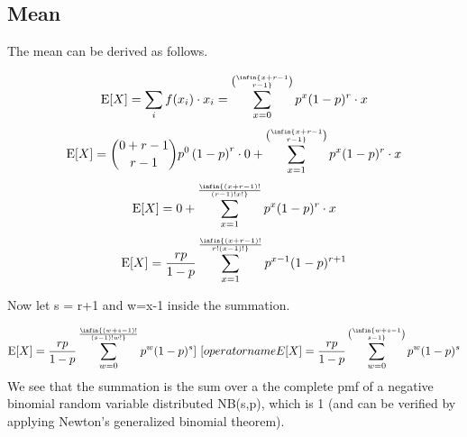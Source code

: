 \subsection{Mean}
The mean can be derived as follows.

\[\operatorname{E}[X] = \sum_i f(x_i)  \cdot x_i = \sum_{x=0}^\infin  {x+r-1 \choose r-1} p^x (1-p)^r  \cdot  x\]
\[\operatorname{E}[X] = {0+r-1 \choose r-1} p^0 \left(1-p\right)^r  \cdot  0 +  \sum_{x=1}^\infin  {x+r-1 \choose r-1} p^x (1-p)^r  \cdot  x\]
\[\operatorname{E}[X] = 0 +  \sum_{x=1}^\infin  {(x+r-1)! \over (r-1)!x!} p^x (1-p)^r  \cdot  x\]
\[\operatorname{E}[X] = {rp \over 1-p}\sum_{x=1}^\infin  {(x+r-1)! \over r!(x-1)!} p^{x-1} (1-p)^{r+1}\]

Now let s = r+1 and w=x-1 inside the summation.

\[\operatorname{E}[X] = {rp \over 1-p}\sum_{w=0}^\infin  {(w+s-1)! \over (s-1)!w!} p^w (1-p)^s]\
[\\operatorname{E}[X] = {rp \over 1-p}\sum_{w=0}^\infin  {w+s-1 \choose s-1} p^w (1-p)^s\]
We see that the summation is the sum over a the complete pmf of a negative binomial random variable distributed NB(s,p), which is 1 (and can be verified by applying Newton's generalized binomial theorem).

